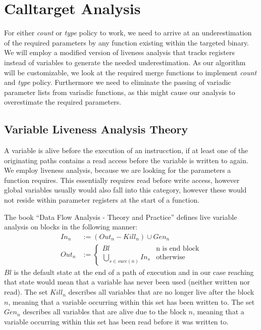 \section{Calltarget Analysis}
\label{section:calltargetanalysis}
For either \emph{count} or \emph{type} policy to work, we need to arrive at an underestimation of the required parameters by any function existing within the targeted binary. We will employ a modified version of liveness analysis that tracks registers instead of variables to generate the needed underestimation. As our algorithm will be customizable, we look at the required merge functions to implement \emph{count} and \emph{type} policy. Furthermore we need to eliminate the passing of variadic parameter lists from variadic functions, as this might cause our analysis to overestimate the required parameters.

\subsection{Variable Liveness Analysis Theory}
\label{subsection:livenessanalysis}
A variable is alive before the execution of an instrucction, if at least one of the originating paths contains a read access before the variable is written to again. We employ liveness analysis, because we are looking for the  parameters a function requires. This essentially requires read before write access, however global variables usually would also fall into this category, however these would not reside within parameter registers at the start of a function.

The book ``Data Flow Analysis - Theory and Practice'' \cite{khedker2009data} defines live variable analysis on blocks in the following manner:
\begin{subequations}
\label{eq:livenessbasedef}
\begin{align}
In_n &:= (Out_n - Kill_n) \cup Gen_n \label{eq:livenessbasedefIn} \\
Out_n &:= \left\{
  \begin{array}{lr}
    Bl & \text{n is end block}\\
    \underset{s \in succ(n)}{\bigcup} In_s & \text{otherwise}
  \end{array}
\right. \label{eq:livenessbasedefOut}
\end{align}
\end{subequations}
$Bl$ is the default state at the end of a path of execution and in our case reaching that state would mean that a variable has never been used (neither written nor read). The set $Kill_n$ describes all variables that are no longer live after the block $n$, meaning that a variable occurring within this set has been written to. The set $Gen_n$ describes all variables that are alive due to the block $n$, meaning that a variable occurring within this set has been read before it was written to.

